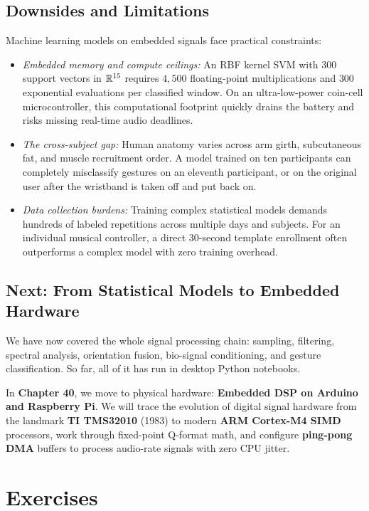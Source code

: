 \subsection{Downsides and Limitations}
Machine learning models on embedded signals face practical constraints:
\begin{itemize}
  \item \emph{Embedded memory and compute ceilings:} An RBF kernel SVM with $300$ support vectors in $\mathbb{R}^{15}$ requires $4,500$ floating-point multiplications and $300$ exponential evaluations per classified window. On an ultra-low-power coin-cell microcontroller, this computational footprint quickly drains the battery and risks missing real-time audio deadlines.
  \item \emph{The cross-subject gap:} Human anatomy varies across arm girth, subcutaneous fat, and muscle recruitment order. A model trained on ten participants can completely misclassify gestures on an eleventh participant, or on the original user after the wristband is taken off and put back on.
  \item \emph{Data collection burdens:} Training complex statistical models demands hundreds of labeled repetitions across multiple days and subjects. For an individual musical controller, a direct 30-second template enrollment often outperforms a complex model with zero training overhead.
\end{itemize}

\subsection{Next: From Statistical Models to Embedded Hardware}
We have now covered the whole signal processing chain: sampling, filtering, spectral analysis, orientation fusion, bio-signal conditioning, and gesture classification. So far, all of it has run in desktop Python notebooks. 

In \textbf{Chapter 40}, we move to physical hardware: \textbf{Embedded DSP on Arduino and Raspberry Pi}. We will trace the evolution of digital signal hardware from the landmark \textbf{TI TMS32010} (1983) to modern \textbf{ARM Cortex-M4 SIMD} processors, work through fixed-point Q-format math, and configure \textbf{ping-pong DMA} buffers to process audio-rate signals with zero CPU jitter.

\section{Exercises}
\label{ch39:exercises}

